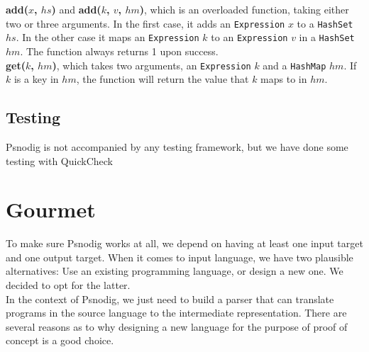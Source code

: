 \textbf{add($x$, $hs$)} and \textbf{add($k$, $v$, $hm$)}, which is an overloaded function, taking either two or three arguments. In the first case, it adds an \texttt{Expression} $x$ to a \texttt{HashSet} $hs$. In the other case it maps an \texttt{Expression} $k$ to an \texttt{Expression} $v$ in a \texttt{HashSet} $hm$. The function always returns 1 upon success. \\

\textbf{get($k$, $hm$)}, which takes two arguments, an \texttt{Expression} $k$ and a \texttt{HashMap} $hm$. If $k$ is a key in $hm$, the function will return the value that $k$ maps to in $hm$. \\


\subsection{Testing}

Psnodig is not accompanied by any testing framework, but we have done some testing with QuickCheck \hfill \\



\section{Gourmet}

To make sure Psnodig works at all, we depend on having at least one input target and one output target. When it comes to input language, we have two plausible alternatives: Use an existing programming language, or design a new one. We decided to opt for the latter. \hfill \\

In the context of Psnodig, we just need to build a parser that can translate programs in the source language to the intermediate representation. There are several reasons as to why designing a new language for the purpose of proof of concept is a good choice. \hfill \\

